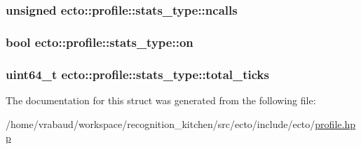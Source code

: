 \subsubsection[{ncalls}]{\setlength{\rightskip}{0pt plus 5cm}unsigned ecto\+::profile\+::stats\+\_\+type\+::ncalls}\label{structecto_1_1profile_1_1stats__type_a570c8df89c2318ab98757e29670ba70b}
\hypertarget{structecto_1_1profile_1_1stats__type_a25c84366176dc49eb9b113a4e74c6b5a}{}
\subsubsection[{on}]{\setlength{\rightskip}{0pt plus 5cm}bool ecto\+::profile\+::stats\+\_\+type\+::on}\label{structecto_1_1profile_1_1stats__type_a25c84366176dc49eb9b113a4e74c6b5a}
\hypertarget{structecto_1_1profile_1_1stats__type_affa2973693dec71733bcf8f7b6cf9c0b}{}
\subsubsection[{total\+\_\+ticks}]{\setlength{\rightskip}{0pt plus 5cm}uint64\+\_\+t ecto\+::profile\+::stats\+\_\+type\+::total\+\_\+ticks}\label{structecto_1_1profile_1_1stats__type_affa2973693dec71733bcf8f7b6cf9c0b}


The documentation for this struct was generated from the following file\+:\begin{DoxyCompactItemize}
\item 
/home/vrabaud/workspace/recognition\+\_\+kitchen/src/ecto/include/ecto/\hyperlink{profile_8hpp}{profile.\+hpp}\end{DoxyCompactItemize}

